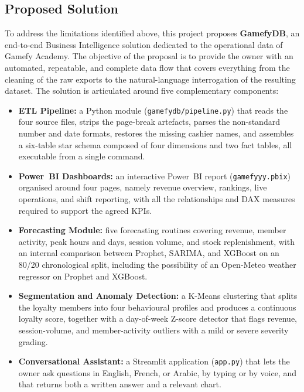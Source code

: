 \documentclass[12pt, a4paper]{report}
\begin{document}
\subsection{Proposed Solution}

To address the limitations identified above, this project proposes
\textbf{GamefyDB}, an end-to-end Business Intelligence solution dedicated to
the operational data of Gamefy Academy. The objective of the proposal is to
provide the owner with an automated, repeatable, and complete data flow that
covers everything from the cleaning of the raw exports to the natural-language
interrogation of the resulting dataset. The solution is articulated around
five complementary components:

\begin{itemize}
  \item \textbf{ETL Pipeline:} a Python module
        (\texttt{gamefydb/pipeline.py}) that reads the four source files,
        strips the page-break artefacts, parses the non-standard number and
        date formats, restores the missing cashier names, and assembles a
        six-table star schema composed of four dimensions and two fact
        tables, all executable from a single command.
  \item \textbf{Power~BI Dashboards:} an interactive
        Power~BI report (\texttt{gamefyyy.pbix}) organised around four
        pages, namely revenue overview, rankings, live operations, and shift
        reporting, with all the relationships and DAX measures required to
        support the agreed KPIs.
  \item \textbf{Forecasting Module:} five forecasting routines covering
        revenue, member activity, peak hours and days, session volume, and
        stock replenishment, with an internal comparison between Prophet,
        SARIMA, and XGBoost on an 80/20 chronological split, including the
        possibility of an Open-Meteo weather regressor on Prophet and
        XGBoost.
  \item \textbf{Segmentation and Anomaly Detection:} a K-Means clustering
        that splits the loyalty members into four behavioural profiles and
        produces a continuous loyalty score, together with a day-of-week
        Z-score detector that flags revenue, session-volume, and
        member-activity outliers with a mild or severe severity grading.
  \item \textbf{Conversational Assistant:} a Streamlit application
        (\texttt{app.py}) that lets the owner ask questions in English,
        French, or Arabic, by typing or by voice, and that returns both a
        written answer and a relevant chart.
\end{itemize}
\end{document}
